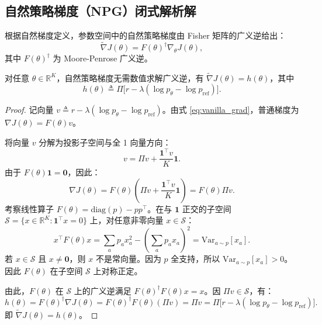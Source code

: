 \documentclass[11pt, a4paper, UTF8]{ctexart}
\begin{document}
\subsection{自然策略梯度（NPG）闭式解析解}

根据自然梯度定义，参数空间中的自然策略梯度由 Fisher 矩阵的广义逆给出：
\begin{equation}
    \tilde{\nabla} J(\theta) = F(\theta)^\dagger \nabla_\theta J(\theta),
\end{equation}
其中 $F(\theta)^\dagger$ 为 Moore-Penrose 广义逆。

\begin{derivbox}
对任意 $\theta \in \mathbb{R}^K$，自然策略梯度无需数值求解广义逆，有 $\tilde{\nabla} J(\theta) = h(\theta)$，其中
\begin{equation}
    h(\theta) \triangleq \Pi \Big[ r - \lambda (\log p_\theta - \log p_{\mathrm{ref}}) \Big].
    \label{eq:npg_closed_form}
\end{equation}
\end{derivbox}

\begin{proof}
记向量 $v \triangleq r - \lambda (\log p_\theta - \log p_{\mathrm{ref}})$。由式 \eqref{eq:vanilla_grad}，普通梯度为 $\nabla J(\theta) = F(\theta) v$。

将向量 $v$ 分解为投影子空间与全 1 向量方向：
\begin{equation}
    v = \Pi v + \frac{\mathbf{1}^\top v}{K} \mathbf{1}.
\end{equation}
由于 $F(\theta) \mathbf{1} = \mathbf{0}$，因此：
\begin{equation}
    \nabla J(\theta) = F(\theta) \left( \Pi v + \frac{\mathbf{1}^\top v}{K} \mathbf{1} \right) = F(\theta) \Pi v.
\end{equation}
考察线性算子 $F(\theta) = \mathrm{diag}(p) - p p^\top$。在与 $\mathbf{1}$ 正交的子空间 $\mathcal{S} = \{x \in \mathbb{R}^K : \mathbf{1}^\top x = 0\}$ 上，对任意非零向量 $x \in \mathcal{S}$：
\begin{equation}
    x^\top F(\theta) x = \sum_a p_a x_a^2 - \left(\sum_a p_a x_a\right)^2 = \mathrm{Var}_{a \sim p}[x_a].
\end{equation}
若 $x \in \mathcal{S}$ 且 $x \neq \mathbf{0}$，则 $x$ 不是常向量。因为 $p$ 全支持，所以 $\mathrm{Var}_{a \sim p}[x_a] > 0$。因此 $F(\theta)$ 在子空间 $\mathcal{S}$ 上对称正定。

由此，$F(\theta)$ 在 $\mathcal{S}$ 上的广义逆满足 $F(\theta)^\dagger F(\theta) x = x$。因 $\Pi v \in \mathcal{S}$，有：
\begin{equation}
    h(\theta) = F(\theta)^\dagger \nabla J(\theta) = F(\theta)^\dagger F(\theta) (\Pi v) = \Pi v = \Pi \Big[ r - \lambda (\log p_\theta - \log p_{\mathrm{ref}}) \Big].
\end{equation}
即 $\tilde{\nabla} J(\theta) = h(\theta)$。
\end{proof}
\end{document}
